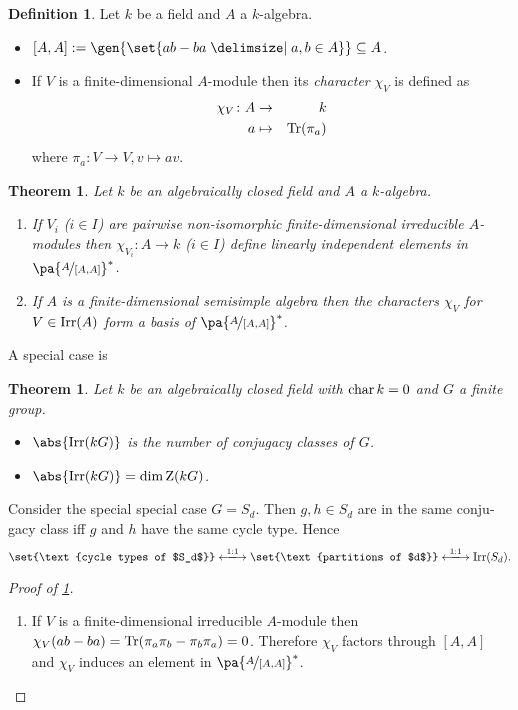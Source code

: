 \documentclass[12pt,a4paper]{scrartcl}
\theoremstyle{cplain}
\theoremstyle{cplain}
\newtheorem{thm}[thmcounter]{Theorem}
\theoremstyle{cplain}
\theoremstyle{definition}
\newtheorem*{deff}{Definition}
\begin{document}
\begin{otherlanguage}{english}
\begin{deff}
  Let $k$ be a field and $A$ a $k$-algebra.
  \begin{itemize}
    \item $[A,A] := \gen{\set{ab-ba\given a,b\in A}} \subseteq A$.
    \item If $V$ is a finite-dimensional $A$-module then its \emph{character} $\chi_V$ is defined as
    \begin{eqnarray*}
      \chi_V \colon A &\to& k \\
      a &\mapsto& \operatorname{Tr}(\pi_a)
    \end{eqnarray*}
    where $\pi_a\colon V\to V, v\mapsto av$.
  \end{itemize}
\end{deff}

\begin{thm} \label{thm:VI.10}
  Let $k$ be an algebraically closed field and $A$ a $k$-algebra.
  \begin{enumerate}
    \item \label{thm:VI.10:1} If $V_i$ ($i\in I$) are pairwise non-isomorphic finite-dimensional irreducible $A$-modules then $\chi_{V_i}\colon A \to k$ ($i\in I$) define linearly independent elements in $\pa{\fak A{[A,A]}}^*$.
    \item \label{thm:VI.10:2} If $A$ is a finite-dimensional semisimple algebra then the characters $\chi_V$ for $V \in \operatorname{Irr}(A)$ form a basis of $\pa{\fak A{[A,A]}}^*$.
  \end{enumerate}
\end{thm}

A special case is
\begin{thm}
  Let $k$ be an algebraically closed field with $\operatorname{char} k = 0$ and $G$ a finite group.
  \begin{itemize}
    \item $\abs{\Irr(kG)}$ is the number of conjugacy classes of $G$.
    \item $\abs{\Irr(kG)} = \dim \Z(kG)$.
  \end{itemize}
\end{thm}

Consider the special special case $G = S_d$. Then $g,h \in S_d$ are in the same conjugacy class iff $g$ and $h$ have the same cycle type. Hence
\[
  \set{\text{cycle types of $S_d$}} \xlongleftrightarrow{1:1} \set{\text{partitions of $d$}} \xlongleftrightarrow{1:1} \Irr(S_d).
\]

\begin{proof}[Proof of \cref{thm:VI.10}]
  \leavevmode
  \begin{enumerate}[label=\ref{thm:VI.10:\arabic*}]
    \item If $V$ is a finite-dimensional irreducible $A$-module then $\chi_V(ab-ba) = \operatorname{Tr}(\pi_a\pi_b - \pi_b\pi_a) = 0$. Therefore $\chi_V$ factors through $[A,A]$ and $\chi_V$ induces an element in $\pa{\fak A{[A,A]}}^*$.
    

\end{enumerate}
\end{proof}
\end{otherlanguage}
\end{document}
